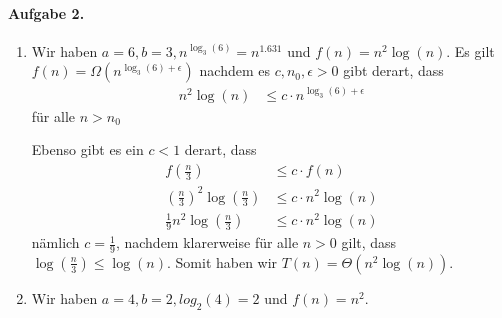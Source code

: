 \documentclass{article}
\begin{document}
\paragraph{Aufgabe 2.}

\begin{enumerate}
    \item Wir haben $a = 6, b = 3, n^{\log_{3}(6)} = n^{1.631}$ und $f(n) = n^2 \log(n)$. Es gilt $f(n) = \Omega(n^{\log_{3}(6) + \epsilon})$ nachdem es $c, n_0, \epsilon > 0$ gibt derart, dass
    \begin{align*}
        n^2 \log(n) &\leq c \cdot n^{\log_{3}(6) + \epsilon}
    \end{align*}
    für alle $n > n_0$

    Ebenso gibt es ein $c < 1$ derart, dass
    \begin{align*}
        f\left(\frac{n}{3}\right) &\leq c \cdot f(n) \\
        \left(\frac{n}{3}\right)^2 \log(\frac{n}{3}) &\leq c \cdot n^2 \log(n) \\
        \frac{1}{9}n^2 \log(\frac{n}{3}) &\leq c \cdot n^2 \log(n)
    \end{align*}
    nämlich $c = \frac{1}{9}$, nachdem klarerweise für alle $n > 0$ gilt, dass $\log(\frac{n}{3}) \leq \log(n)$. Somit haben wir $T(n) = \Theta(n^2 \log(n))$.

    \item Wir haben $a = 4, b = 2, log_2(4) = 2$ und $f(n) = n^2$.
\end{enumerate}
\end{document}
